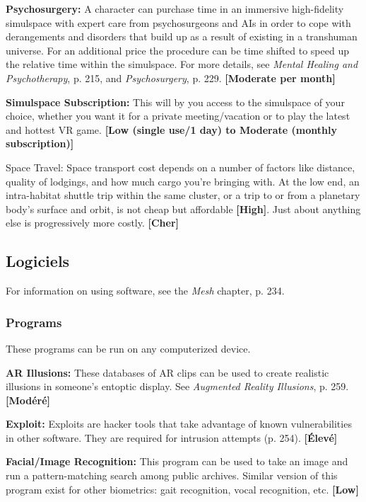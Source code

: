 {{\textbf{Psychosurgery:} A character can purchase time in an immersive high-fidelity simulspace with expert care from psychosurgeons and AIs in order to cope with derangements and disorders that build up as a result of existing in a transhuman universe. For an additional price the procedure can be time shifted to speed up the relative time within the simulspace. For more details, see \emph{Mental Healing and Psychotherapy}, p. 215, and \emph{Psychosurgery}, p. 229. \textbf{[Moderate per month]} 

\textbf{Simulspace Subscription:} This will by you access to the simulspace of your choice, whether you want it for a private meeting/vacation or to play the latest and hottest VR game. \textbf{[Low (single use/1 day) to Moderate (monthly subscription)]} 

Space Travel: Space transport cost depends on a number of factors like distance, quality of lodgings, and how much cargo you’re bringing with. At the low end, an intra-habitat shuttle trip within the same cluster, or a trip to or from a planetary body’s surface and orbit, is not cheap but affordable \textbf{[High]}. Just about anything else is progressively more costly. \textbf{[Cher]} 

\subsection{Logiciels} \label{sec:software} 

For information on using software, see the \emph{Mesh} chapter, p. 234. 

\subsubsection{Programs} 

These programs can be run on any computerized device. 

\textbf{AR Illusions: }These databases of AR clips can be used to create realistic illusions in someone’s entoptic display. See \emph{Augmented Reality Illusions}, p. 259. \textbf{[Modéré]} 

\textbf{Exploit:} Exploits are hacker tools that take advantage of known vulnerabilities in other software. They are required for intrusion attempts (p. 254). \textbf{[Élevé]} 

\textbf{Facial/Image Recognition:} This program can be used to take an image and run a pattern-matching search among public archives. Similar version of this program exist for other biometrics: gait recognition, vocal recognition, etc. \textbf{[Low]} 

}}
